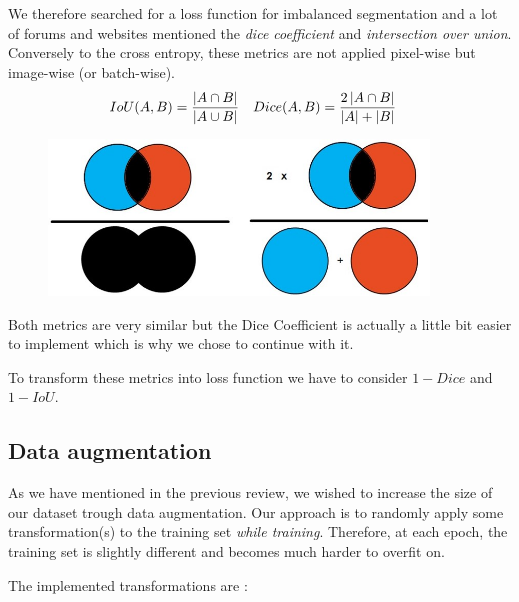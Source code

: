 \documentclass[a4paper, 12pt]{article}
\begin{document}
    We therefore searched for a \og{}loss function for imbalanced segmentation\fg{} and a lot of forums and websites mentioned the \emph{dice coefficient} and \emph{intersection over union}. Conversely to the cross entropy, these metrics are not applied pixel-wise but image-wise (or batch-wise).
    \begin{align*}
        IoU(A, B) & = \frac{\left|A \cap B\right|}{\left|A \cup B\right|} & Dice(A, B) & = \frac{2 \left|A \cap B\right|}{\left|A\right| + \left|B\right|}
    \end{align*}
    
    \begin{figure}[H]
        \centering
        \includegraphics[width=0.9\textwidth]{resources/jpg/iou_dice.jpg}
    \end{figure}
    
    Both metrics are very similar but the Dice Coefficient is actually a little bit easier to implement which is why we chose to continue with it.
    
    \begin{note}
        To transform these metrics into loss function we have to consider $1 - Dice$ and $1 - IoU$.
    \end{note}
    
    \subsection{Data augmentation}

    As we have mentioned in the previous review, we wished to increase the size of our dataset trough data augmentation. Our approach is to randomly apply some transformation(s) to the training set \emph{while training}. Therefore, at each epoch, the training set is slightly different and becomes much harder to overfit on.
    
    The implemented transformations are :
    
\end{document}
